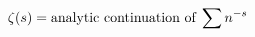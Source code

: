 \documentclass{article}
\begin{document}
\[
\color[rgb]{0.000,0.000,0.000} {
\zeta(s) = \text{analytic continuation of}\;\sum n^{-s}}
\]
\end{document}
